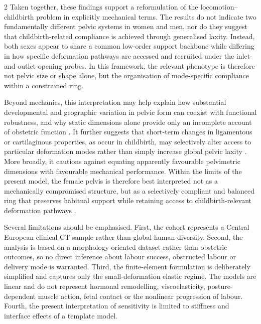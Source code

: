 \documentclass[openacc]{rsproca_new}
\begin{document}
\begin{multicols}{2}
Taken together, these findings support a reformulation of the locomotion--childbirth problem in explicitly mechanical terms. The results do not indicate two fundamentally different pelvic systems in women and men, nor do they suggest that childbirth-related compliance is achieved through generalised laxity. Instead, both sexes appear to share a common low-order support backbone while differing in how specific deformation pathways are accessed and recruited under the inlet- and outlet-opening probes. In this framework, the relevant phenotype is therefore not pelvic size or shape alone, but the organisation of mode-specific compliance within a constrained ring.

Beyond mechanics, this interpretation may help explain how substantial developmental and geographic variation in pelvic form can coexist with functional robustness, and why static dimensions alone provide only an incomplete account of obstetric function \cite{BettiManica2018,Auerbach2018,VerbruggenNowlan2017,Novak2020,KurkiDecrausaz2015}. It further suggests that short-term changes in ligamentous or cartilaginous properties, as occur in childbirth, may selectively alter access to particular deformation modes rather than simply increase global pelvic laxity \cite{Vleeming2012,Kiapour2019,Stolarczyk2021}. More broadly, it cautions against equating apparently favourable pelvimetric dimensions with favourable mechanical performance. Within the limits of the present model, the female pelvis is therefore best interpreted not as a mechanically compromised structure, but as a selectively compliant and balanced ring that preserves habitual support while retaining access to childbirth-relevant deformation pathways \cite{Pavlicev2020,Haeusler2021,Grunstra2023,Warrener2015}.


Several limitations should be emphasised. First, the cohort represents a Central European clinical CT sample rather than global human diversity. Second, the analysis is based on a morphology-oriented dataset rather than obstetric outcomes, so no direct inference about labour success, obstructed labour or delivery mode is warranted. Third, the finite-element formulation is deliberately simplified and captures only the small-deformation elastic regime. The models are linear and do not represent hormonal remodelling, viscoelasticity, posture-dependent muscle action, fetal contact or the nonlinear progression of labour. Fourth, the present interpretation of sensitivity is limited to stiffness and interface effects of a template model.


\end{multicols}
\end{document}
